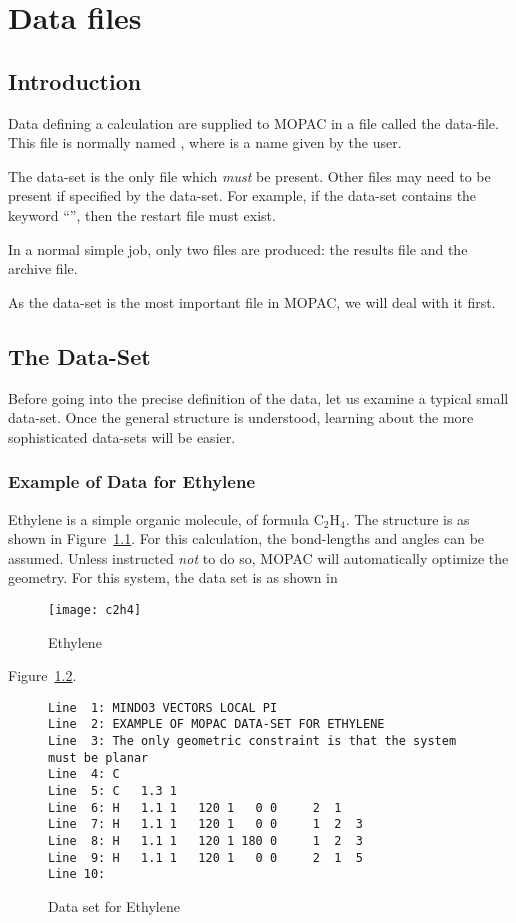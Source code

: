 \chapter{Data files}
\section{Introduction}

Data defining a calculation are supplied to MOPAC in a file called the
data-file. This file is normally named , where
 is  a name given by the user.  

The data-set is the only file which {\em must} be present.  Other files may
need to be present if specified by the data-set.  For example, if the data-set
 contains the keyword ``'', then the restart file
must exist.

In a normal simple job, only two files are produced: the results file and the
archive file.   

As the data-set is the most important file in MOPAC, we will deal with it
first.

\section{The Data-Set}
Before going into the precise definition of the data, let us
examine a typical small data-set.  Once the general structure is understood,
learning about the more sophisticated data-sets will be easier.
\subsection{Example of Data for Ethylene}
Ethylene is a simple organic molecule, of formula C$_2$H$_4$.  The structure
is as shown in Figure~\ref{c2h4}.  For this calculation, the bond-lengths and angles
can be assumed.  Unless instructed {\em not} to do so, MOPAC will automatically
optimize the geometry.  For this system, the data set is as shown in
\begin{figure}
\begin{makeimage}
\end{makeimage}
\begin{center}
\texttt{[image: c2h4]}
\end{center}
\caption{\label{c2h4}Ethylene}
\end{figure}
Figure~\ref{datac2h4}.

\begin{figure}
\begin{makeimage}
\end{makeimage}
\begin{verbatim}
Line  1: MINDO3 VECTORS LOCAL PI
Line  2: EXAMPLE OF MOPAC DATA-SET FOR ETHYLENE
Line  3: The only geometric constraint is that the system must be planar
Line  4: C
Line  5: C   1.3 1
Line  6: H   1.1 1   120 1   0 0     2  1
Line  7: H   1.1 1   120 1   0 0     1  2  3
Line  8: H   1.1 1   120 1 180 0     1  2  3
Line  9: H   1.1 1   120 1   0 0     2  1  5
Line 10:
\end{verbatim}
\caption{\label{datac2h4} Data set for Ethylene}
\end{figure}
        

